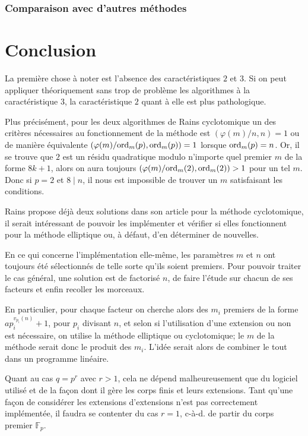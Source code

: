 \documentclass[a4paper]{article} %
\numberwithin{section}{part}
\numberwithin{equation}{section}
\newcommand\GF[1]{\mathbb{F}_{#1}}
\newcommand\ord[2]{\textup{ord}_{#1}(#2)}
\begin{document}
\section{Comparaison avec d'autres méthodes}
%
%
%


\part{Conclusion}
\label{quatre}
La première chose à noter est l'absence des caractéristiques $2$ et $3$. Si on
peut appliquer théoriquement sans trop de problème les algorithmes à la
caractéristique $3$, la caractéristique $2$ quant à elle est plus
pathologique.\par
Plus précisément, pour les deux algorithmes de Rains cyclotomique un des 
critères nécessaires au fonctionnement de la méthode est $(\varphi(m)/n, n) = 1$
ou de manière équivalente $(\varphi(m)/\ord{m}{p},\ord{m}{p}) = 1$
lorsque $\ord{m}{p} = n$. Or, il se trouve que $2$ est un résidu
quadratique modulo n'importe quel premier $m$ de la forme $8k + 1$, alors on
aura toujours $(\varphi(m)/\ord{m}{2},\ord{m}{2}) > 1$ pour un tel
$m$. Donc si $p = 2$ et $8\mid n$, il nous est impossible de trouver un $m$
satisfaisant les conditions.\par
Rains propose déjà deux solutions dans son article pour la méthode cyclotomique,
il serait intéressant de pouvoir les implémenter et vérifier si elles
fonctionnent pour la méthode elliptique ou, à défaut, d'en déterminer de
nouvelles.

\vspace{0.3cm}

En ce qui concerne l'implémentation elle-même, les paramètres $m$ et $n$ ont 
toujours été sélectionnés de telle sorte qu'ils soient premiers. Pour pouvoir 
traiter le cas général, une solution est de factorisé $n$, de faire l'étude sur 
chacun de ses facteurs et enfin recoller les morceaux.\par
En particulier, pour chaque facteur on cherche alors des $m_i$ premiers de la 
forme $ap_i^{v_{p_i}(n)} + 1$, pour $p_i$ divisant $n$, et selon si 
l'utilisation d'une extension ou non est nécessaire, on utilise la méthode 
elliptique ou cyclotomique; le $m$ de la méthode serait donc le produit des 
$m_i$. L'idée serait alors de combiner le tout dans un programme linéaire.\par
Quant au cas $q = p^r$ avec $r>1$, cela ne dépend malheureusement que du
logiciel utilisé et de la façon dont il gère les corps finis et leurs
extensions. Tant qu'une façon de considérer les extensions d'extensions 
n'est pas correctement implémentée, il faudra se contenter du cas $r = 1$,
c-à-d. de partir du corps premier $\GF{p}$.
\end{document}
